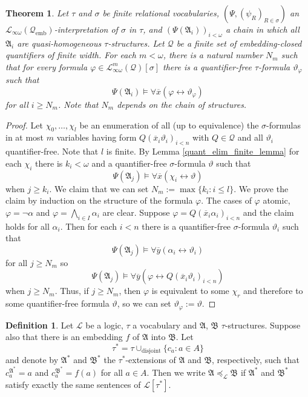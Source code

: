 \documentclass{ndjflart}
\theoremstyle{plain}
\newtheorem{theorem}[conjecture]{Theorem}
\theoremstyle{definition}
\newtheorem{definition}[conjecture]{Definition}
\numberwithin{equation}{section}
\DeclareMathOperator{\emb}{emb}
\DeclareMathOperator{\disjoint}{disjoint}
\begin{document}
\begin{theorem}\label{finite}
Let $\tau$ and $\sigma$ be finite relational vocabularies,
$(\Psi, (\psi_R)_{R \in \sigma})$ an
$\mathcal{L}_{\infty \omega}(\mathcal{Q}_{\emb})$-interpretation of
$\sigma$ in $\tau$, and $(\Psi(\mathfrak{A}_i))_{i < \omega}$
a chain in which all $\mathfrak{A}_i$ are quasi-homogeneous $\tau$-structures.
Let $\mathcal{Q}$ be a finite set of embedding-closed quantifiers of finite width.
For each $m< \omega$, there is a natural number $N_m$ such that for every formula
$\varphi \in \mathcal{L}^m_{\infty \omega}(\mathcal{Q})[\sigma]$ there is a
quantifier-free $\tau$-formula $\vartheta_{\varphi}$ such that
\[
	\Psi(\mathfrak{A}_i) \vDash \forall \overline{x}(\varphi
	\leftrightarrow \vartheta_{\varphi})
\]
for all $i \geq N_m$.
Note that $N_m$ depends on the chain of structures.
\end{theorem}
\begin{proof}
Let $\chi_0,\dots,\chi_l$ be an enumeration of all (up to equivalence) the
$\sigma$-formulas in at most $m$ variables having form
$Q(\overline{x}_i\vartheta_i)_{i<n}$ with $Q \in \mathcal{Q}$ and all
$\vartheta_i$ quantifier-free.
Note that $l$ is finite.
By Lemma \ref{quant_elim_finite_lemma} for each $\chi_i$ there is
$k_i < \omega$ and a quantifier-free $\sigma$-formula $\vartheta$ such that
\[
	\Psi(\mathfrak{A}_j) \vDash \forall \overline{x} (\chi_i \leftrightarrow \vartheta)
\]
when $j \geq k_i$.
We claim that we can set $N_m := \max\{k_i : i \leq l\}$.
We prove the claim by induction on the structure of the formula $\varphi$.
The cases of $\varphi$ atomic, $\varphi = \neg \alpha$ and
$\varphi = \bigwedge_{i \in I}\alpha_i$ are clear.
Suppose $\varphi = Q(\overline{x}_i\alpha_i)_{i<n}$ and the claim holds for all
$\alpha_i$.
Then for each $i < n$ there is a quantifier-free $\sigma$-formula $\vartheta_i$
such that
\[
	\Psi(\mathfrak{A}_j) \vDash \forall \overline{y}(\alpha_i
	\leftrightarrow \vartheta_i)
\]
for all $j \geq N_m$ so
\[
	\Psi(\mathfrak{A}_j) \vDash \forall \overline{y}(\varphi
	\leftrightarrow Q(\overline{x}_i\vartheta_i)_{i<n})
\]
when $j \geq N_m$. Thus, if $j \geq N_m$, then $\varphi$ is equivalent to some
$\chi_r$ and therefore to some quantifier-free formula $\vartheta$, so we can
set $\vartheta_{\varphi} := \vartheta$.
\end{proof}

\begin{definition}
Let $\mathcal{L}$ be a logic, $\tau$ a vocabulary and
$\mathfrak{A}$, $\mathfrak{B}$ $\tau$-structures.
Suppose also that there is an embedding $f$ of $\mathfrak{A}$ into $\mathfrak{B}$.
Let
\[
	\tau^* = \tau \cup_{\disjoint} \{c_a : a \in A\}
\]
and denote by $\mathfrak{A}^*$ and $\mathfrak{B}^*$ the $\tau^*$-extensions of
$\mathfrak{A}$ and $\mathfrak{B}$, respectively, such that
$c_a^{\mathfrak{A}^*} = a$ and $c_a^{\mathfrak{B}^*} = f(a)$ for all $a \in A$.
Then we write $\mathfrak{A} \preceq_{\mathcal{L}} \mathfrak{B}$ if
$\mathfrak{A}^*$ and $\mathfrak{B}^*$ satisfy exactly the same sentences of
$\mathcal{L}[\tau^*]$.
\end{definition}
\end{document}
